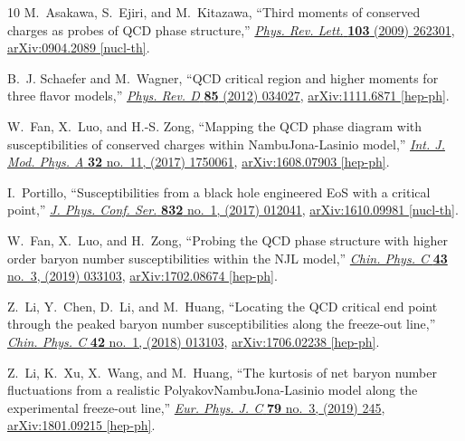 \documentclass[a4paper,12pt]{article}
\numberwithin{equation}{section}
\begin{document}
\begin{thebibliography}{10}
	M.~Asakawa, S.~Ejiri, and M.~Kitazawa, ``{Third moments of conserved charges as
		probes of QCD phase structure},''
	\href{http://dx.doi.org/10.1103/PhysRevLett.103.262301}{{\em Phys. Rev.
			Lett.} {\bfseries 103} (2009) 262301},
	\href{http://arxiv.org/abs/0904.2089}{{\ttfamily arXiv:0904.2089 [nucl-th]}}.
	
	B.~J. Schaefer and M.~Wagner, ``{QCD critical region and higher moments for
		three flavor models},''
	\href{http://dx.doi.org/10.1103/PhysRevD.85.034027}{{\em Phys. Rev. D}
		{\bfseries 85} (2012) 034027},
	\href{http://arxiv.org/abs/1111.6871}{{\ttfamily arXiv:1111.6871 [hep-ph]}}.
	
	W.~Fan, X.~Luo, and H.-S. Zong, ``{Mapping the QCD phase diagram with
		susceptibilities of conserved charges within Nambu\textendash{}Jona-Lasinio
		model},'' \href{http://dx.doi.org/10.1142/S0217751X17500610}{{\em Int. J.
			Mod. Phys. A} {\bfseries 32} no.~11, (2017) 1750061},
	\href{http://arxiv.org/abs/1608.07903}{{\ttfamily arXiv:1608.07903
			[hep-ph]}}.
	
	I.~Portillo, ``{Susceptibilities from a black hole engineered EoS with a
		critical point},''
	\href{http://dx.doi.org/10.1088/1742-6596/832/1/012041}{{\em J. Phys. Conf.
			Ser.} {\bfseries 832} no.~1, (2017) 012041},
	\href{http://arxiv.org/abs/1610.09981}{{\ttfamily arXiv:1610.09981
			[nucl-th]}}.
	
	W.~Fan, X.~Luo, and H.~Zong, ``{Probing the QCD phase structure with higher
		order baryon number susceptibilities within the NJL model},''
	\href{http://dx.doi.org/10.1088/1674-1137/43/3/033103}{{\em Chin. Phys. C}
		{\bfseries 43} no.~3, (2019) 033103},
	\href{http://arxiv.org/abs/1702.08674}{{\ttfamily arXiv:1702.08674
			[hep-ph]}}.
	
	Z.~Li, Y.~Chen, D.~Li, and M.~Huang, ``{Locating the QCD critical end point
		through the peaked baryon number susceptibilities along the freeze-out
		line},'' \href{http://dx.doi.org/10.1088/1674-1137/42/1/013103}{{\em Chin.
			Phys. C} {\bfseries 42} no.~1, (2018) 013103},
	\href{http://arxiv.org/abs/1706.02238}{{\ttfamily arXiv:1706.02238
			[hep-ph]}}.
	
	Z.~Li, K.~Xu, X.~Wang, and M.~Huang, ``{The kurtosis of net baryon number
		fluctuations from a realistic
		Polyakov\textendash{}Nambu\textendash{}Jona-Lasinio model along the
		experimental freeze-out line},''
	\href{http://dx.doi.org/10.1140/epjc/s10052-019-6703-x}{{\em Eur. Phys. J. C}
		{\bfseries 79} no.~3, (2019) 245},
	\href{http://arxiv.org/abs/1801.09215}{{\ttfamily arXiv:1801.09215
			[hep-ph]}}.
	

\end{thebibliography}
\end{document}
